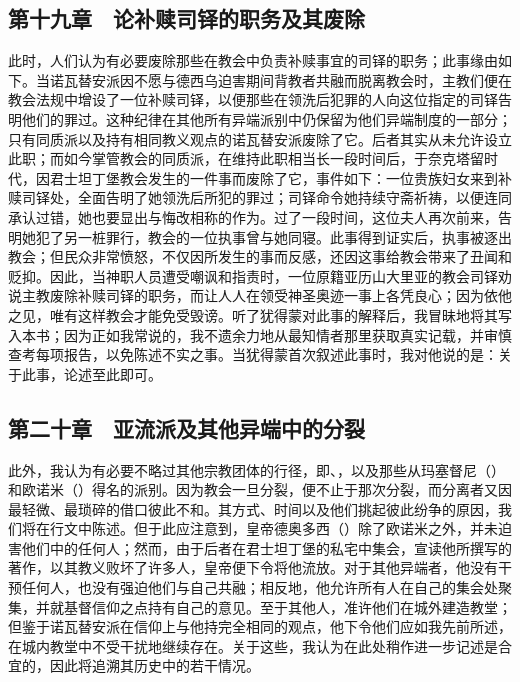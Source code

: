 
\subsection{第十九章　论补赎司铎的职务及其废除}

此时，人们认为有必要废除那些在教会中负责补赎事宜的司铎的职务；此事缘由如下。当诺瓦替安派因不愿与德西乌迫害期间背教者共融而脱离教会时，主教们便在教会法规中增设了一位补赎司铎，以便那些在领洗后犯罪的人向这位指定的司铎告明他们的罪过。这种纪律在其他所有异端派别中仍保留为他们异端制度的一部分；只有同质派以及持有相同教义观点的诺瓦替安派废除了它。后者其实从未允许设立此职；而如今掌管教会的同质派，在维持此职相当长一段时间后，于奈克塔留时代，因君士坦丁堡教会发生的一件事而废除了它，事件如下：一位贵族妇女来到补赎司铎处，全面告明了她领洗后所犯的罪过；司铎命令她持续守斋祈祷，以便连同承认过错，她也要显出与悔改相称的作为。过了一段时间，这位夫人再次前来，告明她犯了另一桩罪行，教会的一位执事曾与她同寝。此事得到证实后，执事被逐出教会；但民众非常愤怒，不仅因所发生的事而反感，还因这事给教会带来了丑闻和贬抑。因此，当神职人员遭受嘲讽和指责时，一位原籍亚历山大里亚的教会司铎劝说主教废除补赎司铎的职务，而让人人在领受神圣奥迹一事上各凭良心；因为依他之见，唯有这样教会才能免受毁谤。听了犹得蒙对此事的解释后，我冒昧地将其写入本书；因为正如我常说的，我不遗余力地从最知情者那里获取真实记载，并审慎查考每项报告，以免陈述不实之事。当犹得蒙首次叙述此事时，我对他说的是：关于此事，论述至此即可。\par


\subsection{第二十章　亚流派及其他异端中的分裂}

此外，我认为有必要不略过其他宗教团体的行径，即、，以及那些从玛塞督尼（）和欧诺米（）得名的派别。因为教会一旦分裂，便不止于那次分裂，而分离者又因最轻微、最琐碎的借口彼此不和。其方式、时间以及他们挑起彼此纷争的原因，我们将在行文中陈述。但于此应注意到，皇帝德奥多西（）除了欧诺米之外，并未迫害他们中的任何人；然而，由于后者在君士坦丁堡的私宅中集会，宣读他所撰写的著作，以其教义败坏了许多人，皇帝便下令将他流放。对于其他异端者，他没有干预任何人，也没有强迫他们与自己共融；相反地，他允许所有人在自己的集会处聚集，并就基督信仰之点持有自己的意见。至于其他人，准许他们在城外建造教堂；但鉴于诺瓦替安派在信仰上与他持完全相同的观点，他下令他们应如我先前所述，在城内教堂中不受干扰地继续存在。关于这些，我认为在此处稍作进一步记述是合宜的，因此将追溯其历史中的若干情况。\par

